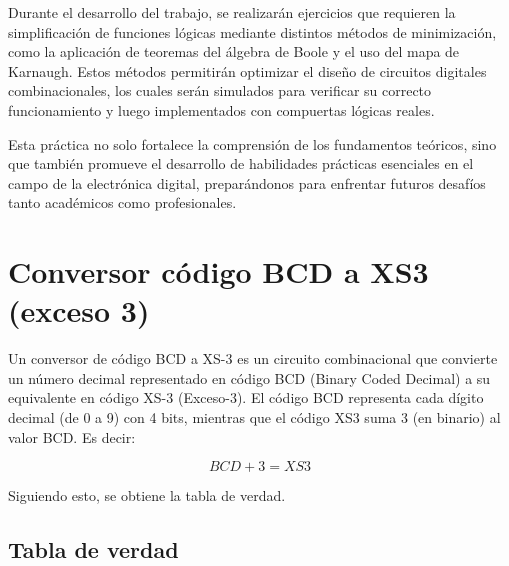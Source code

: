 \documentclass[12pt,a4paper]{report}
\begin{document}
Durante el desarrollo del trabajo, se realizarán ejercicios que requieren la simplificación de funciones lógicas mediante distintos métodos
de minimización, como la aplicación de teoremas del álgebra de Boole y el uso del mapa de Karnaugh. Estos métodos permitirán optimizar el
diseño de circuitos digitales combinacionales, los cuales serán simulados para verificar
su correcto funcionamiento y luego implementados con compuertas lógicas reales.

Esta práctica no solo fortalece la comprensión de los fundamentos teóricos, sino que también promueve el desarrollo de habilidades prácticas
esenciales en el campo de la electrónica digital, preparándonos para enfrentar futuros desafíos tanto académicos como profesionales.
    

\chapter{Conversor código BCD a XS3 (exceso 3)}
Un conversor de código BCD a XS-3 es un circuito combinacional que convierte un número decimal representado en código BCD
(Binary Coded Decimal) a su equivalente en código XS-3 (Exceso-3). El código BCD representa cada dígito decimal (de 0 a 9) con 4 bits,
mientras que el código XS3 suma 3 (en binario) al valor BCD. Es decir:

\begin{equation*}
    BCD + 3 = XS3
\end{equation*}

Siguiendo esto, se obtiene la tabla de verdad.

    \section{Tabla de verdad}
\end{document}
